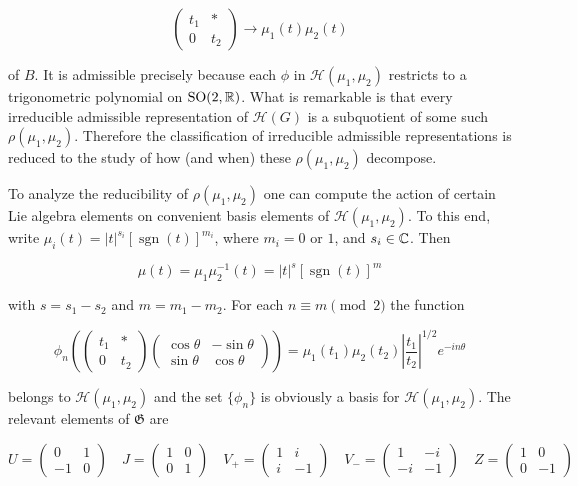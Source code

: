 \[
\begin{pmatrix} t_1 & * \\ 0 & t_2 \end{pmatrix} \to \mu_1(t)\mu_2(t)
\]

of $B$. It is admissible precisely because each $\phi$ in $\mathcal{H}(\mu_1, \mu_2)$ restricts to a trigonometric polynomial on $\operatorname{SO}(2,\mathbb{R})$. What is remarkable is that every irreducible admissible representation of $\mathcal{H}(G)$ is a subquotient of some such $\rho(\mu_1, \mu_2)$. Therefore the classification of irreducible admissible representations is reduced to the study of how (and when) these $\rho(\mu_1, \mu_2)$ decompose.

To analyze the reducibility of $\rho(\mu_1, \mu_2)$ one can compute the action of certain Lie algebra elements on convenient basis elements of $\mathcal{H}(\mu_1, \mu_2)$. To this end, write $\mu_i(t) = |t|^{s_i}[\operatorname{sgn}(t)]^{m_i}$, where $m_i = 0$ or $1$, and $s_i \in \mathbb{C}$. Then

\begin{equation}\label{eq:4.6}
\mu(t) = \mu_1\mu_2^{-1}(t) = |t|^s[\operatorname{sgn}(t)]^m\tag{4.6}
\end{equation}

with $s = s_1 - s_2$ and $m = m_1 - m_2$. For each $n \equiv m \pmod{2}$ the function

\begin{equation}\label{eq:4.7}
\phi_n\!\left(\begin{pmatrix} t_1 & * \\ 0 & t_2 \end{pmatrix} \begin{pmatrix} \cos\theta & -\sin\theta \\ \sin\theta & \cos\theta \end{pmatrix}\right) = \mu_1(t_1)\mu_2(t_2)\left|\frac{t_1}{t_2}\right|^{1/2} e^{-in\theta}\tag{4.7}
\end{equation}

belongs to $\mathcal{H}(\mu_1, \mu_2)$ and the set $\{\phi_n\}$ is obviously a basis for $\mathcal{H}(\mu_1, \mu_2)$. The relevant elements of $\mathfrak{G}$ are

\[
U = \begin{pmatrix} 0 & 1 \\ -1 & 0 \end{pmatrix} \quad J = \begin{pmatrix} 1 & 0 \\ 0 & 1 \end{pmatrix} \quad V_+ = \begin{pmatrix} 1 & i \\ i & -1 \end{pmatrix} \quad V_- = \begin{pmatrix} 1 & -i \\ -i & -1 \end{pmatrix} \quad Z = \begin{pmatrix} 1 & 0 \\ 0 & -1 \end{pmatrix}
\]

